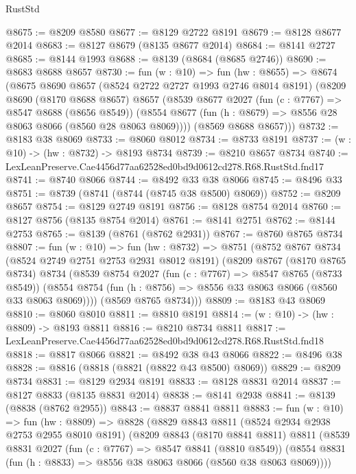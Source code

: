 \begin{lexlean}{RustStd}
\begin{coremodule}
@8675 := @8209 @8580
@8677 := @8129 @2722 @8191
@8679 := @8128 @8677 @2014
@8683 := @8127 @8679 (@8135 @8677 @2014)
@8684 := @8141 @2727
@8685 := @8144 @1993
@8688 := @8139 (@8684 (@8685 @2746))
@8690 := @8683 @8688 @8657
@8730 := fun (w : @10) =>
  fun (hw : @8655) =>
  @8674
    (@8675
      @8690
      @8657
      (@8524 @2722 @2727 @1993 @2746 @8014 @8191)
      (@8209
        @8690
        (@8170 @8688 @8657)
        @8657
        (@8539
          @8677
          @2027
          (fun (c : @7767) => @8547 @8688 (@8656 @8549))
          (@8554 @8677 (fun (h : @8679) => @8556 @28 @8063 @8066 (@8560 @28 @8063 @8069))))
        (@8569 @8688 @8657)))
@8732 := @8183 @38 @8069
@8733 := @8060 @8012
@8734 := @8733 @8191
@8737 := (w : @10) -> (hw : @8732) -> @8193 @8734
@8739 := @8210 @8657 @8734
@8740 := LexLeanPreserve.Cae4456d77aa62528ed0bd9d0612cd278.R68.RustStd.fnd17
@8741 := @8740 @8066
@8744 := @8492 @33 @38 @8066
@8745 := @8496 @33
@8751 := @8739 (@8741 (@8744 (@8745 @38 @8500) @8069))
@8752 := @8209 @8657
@8754 := @8129 @2749 @8191
@8756 := @8128 @8754 @2014
@8760 := @8127 @8756 (@8135 @8754 @2014)
@8761 := @8141 @2751
@8762 := @8144 @2753
@8765 := @8139 (@8761 (@8762 @2931))
@8767 := @8760 @8765 @8734
@8807 := fun (w : @10) =>
  fun (hw : @8732) =>
  @8751
    (@8752
      @8767
      @8734
      (@8524 @2749 @2751 @2753 @2931 @8012 @8191)
      (@8209
        @8767
        (@8170 @8765 @8734)
        @8734
        (@8539
          @8754
          @2027
          (fun (c : @7767) => @8547 @8765 (@8733 @8549))
          (@8554 @8754 (fun (h : @8756) => @8556 @33 @8063 @8066 (@8560 @33 @8063 @8069))))
        (@8569 @8765 @8734)))
@8809 := @8183 @43 @8069
@8810 := @8060 @8010
@8811 := @8810 @8191
@8814 := (w : @10) -> (hw : @8809) -> @8193 @8811
@8816 := @8210 @8734 @8811
@8817 := LexLeanPreserve.Cae4456d77aa62528ed0bd9d0612cd278.R68.RustStd.fnd18
@8818 := @8817 @8066
@8821 := @8492 @38 @43 @8066
@8822 := @8496 @38
@8828 := @8816 (@8818 (@8821 (@8822 @43 @8500) @8069))
@8829 := @8209 @8734
@8831 := @8129 @2934 @8191
@8833 := @8128 @8831 @2014
@8837 := @8127 @8833 (@8135 @8831 @2014)
@8838 := @8141 @2938
@8841 := @8139 (@8838 (@8762 @2955))
@8843 := @8837 @8841 @8811
@8883 := fun (w : @10) =>
  fun (hw : @8809) =>
  @8828
    (@8829
      @8843
      @8811
      (@8524 @2934 @2938 @2753 @2955 @8010 @8191)
      (@8209
        @8843
        (@8170 @8841 @8811)
        @8811
        (@8539
          @8831
          @2027
          (fun (c : @7767) => @8547 @8841 (@8810 @8549))
          (@8554 @8831 (fun (h : @8833) => @8556 @38 @8063 @8066 (@8560 @38 @8063 @8069))))

\end{coremodule}
\end{lexlean}
